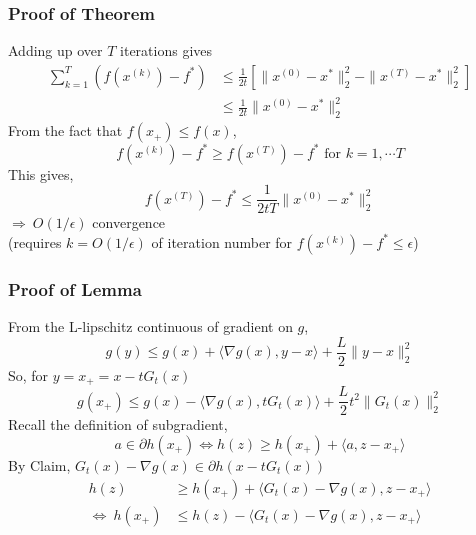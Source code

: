 \documentclass{beamer}
\begin{document}
\begin{frame}
\frametitle{Proof of Theorem}
Adding up over $T$ iterations gives
\begin{align*}
\sum_{k=1}^{T}\left(f(x^{(k)})-f^* \right) &\leq \frac{1}{2t} \left[\|x^{(0)}-x^*\|_2^2 - \|x^{(T)}-x^*\|_2^2\right] \\
&\leq \frac{1}{2t}\|x^{(0)}-x^*\|_2^2
\end{align*}
From the fact that $f(x_+) \leq f(x)$,
\begin{equation*}
f(x^{(k)})-f^* \geq f(x^{(T)})-f^* \text{ for } k=1,\cdots T
\end{equation*}
This gives,
\begin{equation*}
f(x^{(T)})-f^* \leq \frac{1}{2tT} \|x^{(0)}-x^*\|_2^2
\end{equation*}
$\Rightarrow~ O(1/\epsilon)$ convergence\\
(requires $k= O(1/\epsilon)$ of iteration number for $f(x^{(k)})-f^* \leq \epsilon$)

\end{frame}

\begin{frame}
\frametitle{Proof of Lemma}
From the L-lipschitz continuous of gradient on $g$,
\begin{equation*}
g(y) \leq g(x) + \langle \nabla g(x),y-x \rangle +\frac{L}{2}\|y-x\|_2^2
\end{equation*}
So, for $y=x_+=x-tG_t(x)$
\begin{equation}\label{16eq:lemma_proof1}
g(x_+) \leq g(x)- \langle \nabla g(x), tG_t(x) \rangle +\frac{L}{2}t^2 \|G_t(x)\|_2^2
\end{equation}
Recall the definition of subgradient,
\begin{equation*}
a \in \partial h(x_+) \Longleftrightarrow h(z) \geq h(x_+)+\langle a,z-x_+ \rangle
\end{equation*}
By Claim, $G_t(x)-\nabla g(x) \in \partial h(x-tG_t(x))$
\begin{align}
h(z) &\geq h(x_+) + \langle G_t(x) -\nabla g(x),z-x_+ \rangle \nonumber\\
\Leftrightarrow ~h(x_+)&\leq h(z)-\langle G_t(x) -\nabla g(x),z-x_+ \rangle
\label{16eq:lemma_proof2}
\end{align}
\end{frame}
\end{document}

